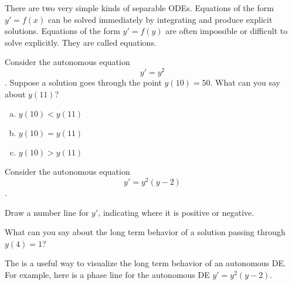 \begin{applicationActivities}

\begin{observation}
There are two very simple kinds of separable ODEs.
\vfill
Equations of the form \(y'=f(x)\) can be solved immediately by integrating and produce explicit solutions.
\vfill
Equations of the form \(y'=f(y)\) are often impossible or difficult to solve explicitly.  They are called  equations.
\end{observation}

\begin{activity}{10}
Consider the autonomous equation \[y'=y^2\].
\vfill
Suppose a solution goes through the point \(y(10)=50 \).  What can you say about \(y(11)\)?
\vfill
\begin{enumerate}[(a)]
\item \(y(10)<y(11)\)
\item \(y(10)=y(11)\)
\item \(y(10)>y(11)\)
\end{enumerate}
\end{activity}

\begin{activity}{10}
Consider the autonomous equation \[y'=y^2(y-2)\].

\begin{subactivity}
Draw a number line for \(y'\), indicating where it is positive or negative.
\end{subactivity}
\begin{subactivity}
What can you say about the long term behavior of a solution passing through \(y(4)=1\)?
\end{subactivity}
\end{activity}

\begin{definition}
The  is a useful way to visualize the long term behavior of an autonomous DE.
\vfill
For example, here is a phase line for the autonomous DE \(y'=y^2(y-2)\).

\begin{center}
\end{center}
\end{definition}


\end{applicationActivities}

